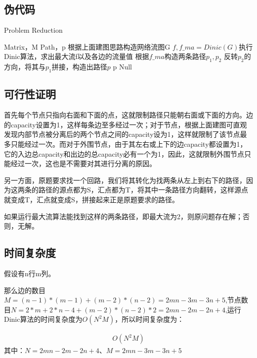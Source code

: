 \documentclass[UTF8,a4paper,12pt]{article}
\begin{document}
\begin{CJK}{UTF8}{gkai}
	
	\subsection{伪代码}
	\begin{algorithm}
		\caption{Problem Reduction}
		\begin{algorithmic}[1]
			\Require Matrix，M
			\Ensure Path，p
			\State 根据上面建图思路构造网络流图G
			\State $f,f\_ma=Dinic(G)$执行Dinic算法，求出最大流f以及各边的流量值
			\State 根据$ f\_ma $构造两条路径$ p_1,p_2 $
			\State 反转$ p_2 $的方向，将其与$ p_1 $拼接，构造出路径$ p $
			\State \Return p
			\EndIf
			\Return Null
			\EndFunction
		\end{algorithmic}
	\end{algorithm}
	\subsection{可行性证明}
	首先每个节点只指向右面和下面的点，这就限制路径只能朝右面或下面的方向。边的capacity设置为1，这样每条边至多经过一次；对于节点，根据上面建图可直观发现内部节点被分离后的两个节点之间的capacity设为1，这样就限制了该节点最多只能经过一次。而对于外围节点，由于其左右或上下的边capacity都设置为1，它的入边总capacity和出边的总capacity必有一个为1，因此，这就限制外围节点只能经过一次，这也是不需要对其进行分离的原因。
	
	另一方面，原题要求找一个回路，我们将其转化为找两条从左上到右下的路径，因为这两条的路径的源点都为S，汇点都为T，将其中一条路径方向翻转，这样源点就变成T，汇点就变成S，拼接起来正是原题要求的路径。
	
	如果运行最大流算法能找到这样的两条路径，即最大流为2，则原问题存在解；否则，无解。
	
	\subsection{时间复杂度}
	假设有n行m列。
	
	那么边的数目$ M=(n-1)*(m-1)+ (m-2)*(n-2) = 2mn-3m-3n+5$,节点数目$ N=2*m+2*n-4+(m-2)*(n-2)*2 = 2mn-2m-2n+4 $,运行Dinic算法的时间复杂度为$ O(N^2M) $，所以时间复杂度为：
	
	\begin{equation*}
	\begin{split}
	O(N^{2}M)
	\end{split}
	\end{equation*}
	其中：$ N=2mn-2m-2n+4 $、$ M=2mn-3m-3n+5 $

	\end{CJK}	
\end{document}
